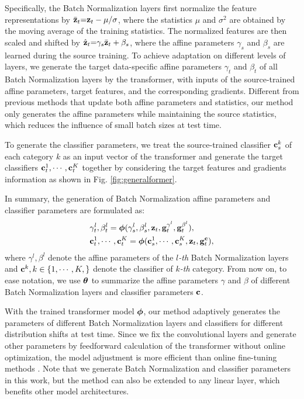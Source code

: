 Specifically, the Batch Normalization layers \cite{ioffe2015batch} first normalize the feature representations by $\bar{\mathbf{z}}_t {=} {\mathbf{z}_t - \mu} / {\sigma}$, where the statistics $\mu$ and $\sigma^2$ are obtained by the moving average of the training statistics. The normalized features are then scaled and shifted by $\hat{\mathbf{z}}_t {=} \gamma_s \bar{\mathbf{z}}_t + \beta_s$, where the affine parameters $\gamma_s$ and $\beta_s$ are learned during the source training. 
To achieve adaptation on different levels of layers, we generate the target data-specific affine parameters $\gamma_t$ and $\beta_t$ of all Batch Normalization layers by the transformer, with inputs of the source-trained affine parameters, target features, and the corresponding gradients. 
Different from previous methods \cite{wang2021tent} that update both affine parameters and statistics, our method only generates the affine parameters while maintaining the source statistics, which reduces the influence of small batch sizes at test time.

To generate the classifier parameters, we treat the source-trained classifier $ \mathbf{c}^k_s $ of each category $ k $ as an input vector of the transformer and generate the target classifiers $ \mathbf{c}^1_t, \cdots, \mathbf{c}^K_t $ together by considering the target features and gradients information as shown in Fig. \ref{fig:generalformer}.

In summary, the generation of Batch Normalization affine parameters and classifier parameters are formulated as:
\begin{equation}
\begin{aligned}
& \gamma^l_t, \beta^l_t = \boldsymbol{\phi} (\gamma^l_s, \beta^l_s, \mathbf{z}_t, \mathbf{g}^{\gamma^l}_t, \mathbf{g}^{\beta^l}_t), \\
& \mathbf{c}^1_t, \cdots, \mathbf{c}^K_t = \boldsymbol{\phi} (\mathbf{c}^1_s, \cdots, \mathbf{c}^K_s, \mathbf{z}_t, \mathbf{g}^{\mathbf{c}}_t),
\label{eqn_genbn}
\end{aligned}
\end{equation}
where $\gamma^l, \beta^l$ denote the affine parameters of the $l$\textit{-th} Batch Normalization layers and $\mathbf{c}^k, k \in \{ 1, \cdots, K, \}$ denote the classifier of $k$\textit{-th} category.  
From now on, to ease notation, we use $\boldsymbol{\theta}$ to summarize the affine parameters $\gamma$ and $\beta$ of different Batch Normalization layers and classifier parameters $\mathbf{c}$.

With the trained transformer model $\boldsymbol{\phi}$, our method adaptively generates the parameters of different Batch Normalization layers and classifiers for different distribution shifts at test time.
Since we fix the convolutional layers and generate other parameters by feedforward calculation of the transformer without online optimization, the model adjustment is more efficient than online fine-tuning methods \cite{wang2021tent, iwasawa2021test}.
Note that we generate Batch Normalization and classifier parameters in this work, but the method can also be extended to any linear layer, which benefits other model architectures.

